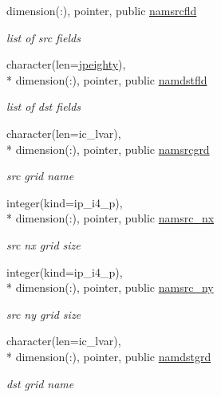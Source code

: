 \begin{DoxyCompactItemize}
dimension(\+:), pointer, public \hyperlink{classmod__oasis__namcouple_a5fcb5a4f2a49f414fafe38b03c5c089d}{namsrcfld}
\begin{DoxyCompactList}\small\item\em list of src fields \end{DoxyCompactList}\item 
character(len=\hyperlink{classmod__oasis__namcouple_a4fb10ad6e864dcbe34c4a8b02204a523}{jpeighty}), \\*
dimension(\+:), pointer, public \hyperlink{classmod__oasis__namcouple_ac4cfec209e4169b6098f9a8b9be1ffb1}{namdstfld}
\begin{DoxyCompactList}\small\item\em list of dst fields \end{DoxyCompactList}\item 
character(len=ic\+\_\+lvar), \\*
dimension(\+:), pointer, public \hyperlink{classmod__oasis__namcouple_a589c1bae58b10bcb0cfb30c0893a7895}{namsrcgrd}
\begin{DoxyCompactList}\small\item\em src grid name \end{DoxyCompactList}\item 
integer(kind=ip\+\_\+i4\+\_\+p), \\*
dimension(\+:), pointer, public \hyperlink{classmod__oasis__namcouple_ac8f6c8fe3720739f3d26431a8a600506}{namsrc\+\_\+nx}
\begin{DoxyCompactList}\small\item\em src nx grid size \end{DoxyCompactList}\item 
integer(kind=ip\+\_\+i4\+\_\+p), \\*
dimension(\+:), pointer, public \hyperlink{classmod__oasis__namcouple_ab82c80f007b37865172ddb033a1abb36}{namsrc\+\_\+ny}
\begin{DoxyCompactList}\small\item\em src ny grid size \end{DoxyCompactList}\item 
character(len=ic\+\_\+lvar), \\*
dimension(\+:), pointer, public \hyperlink{classmod__oasis__namcouple_a7a2ed64b0670db38d2287f5d452060e4}{namdstgrd}
\begin{DoxyCompactList}\small\item\em dst grid name \end{DoxyCompactList}\item 

\end{DoxyCompactItemize}
